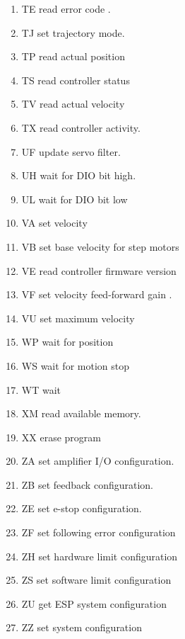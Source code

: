 \documentclass[10pt,letter,twoside]{report}
\begin{document}
\begin{enumerate}
\item TE read error code . 
\item TJ set trajectory mode. 
\item TP read actual position 
\item TS read controller status 
\item TV read actual velocity 
\item TX read controller activity. 
\item UF update servo filter. 
\item UH wait for DIO bit high. 
\item UL wait for DIO bit low 
\item VA set velocity 
\item VB set base velocity for step motors 
\item VE read controller firmware version 
\item VF set velocity feed-forward gain . 
\item VU set maximum velocity 
\item WP wait for position 
\item WS wait for motion stop 
\item WT wait  
\item XM read available memory. 
\item XX erase program 
\item ZA set amplifier I/O configuration. 
\item ZB set feedback configuration. 
\item ZE set e-stop configuration. 
\item ZF set following error configuration 
\item ZH set hardware limit configuration 
\item ZS set software limit configuration 
\item ZU get ESP system configuration 
\item ZZ set system configuration 
\end{enumerate}
\end{document}
